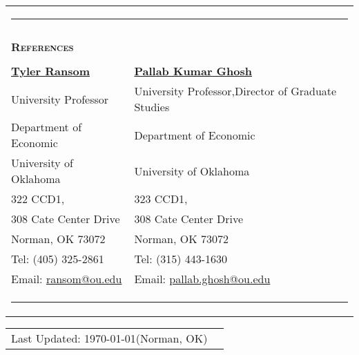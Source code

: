 \documentclass[10pt,letterpaper]{article}
\begin{document}
\begin{tabular}{p{4.25 in}p{3.75in}}
	\multicolumn{2}{p{7.5in}}{\hrule}\\
	\\
	{\large \textsc{\textbf{\large{References}}}} &\\
	\\
	\href{https://tyleransom.github.io/}{\textbf{Tyler Ransom}}                      & \href{https://sites.google.com/site/pallabghoshou/}{\textbf{Pallab Kumar Ghosh}} \\
	University Professor                                                                              & University Professor,Director of Graduate Studies \\
	Department of Economic                                                             & Department of Economic  \\
	University of Oklahoma                                                                    & University of Oklahoma \\
	322 CCD1,                                                                                   & 323 CCD1, \\
	308 Cate Center Drive                                                                              & 308 Cate Center Drive  \\
	Norman, OK 73072                                                                              & Norman, OK 73072   \\
	Tel: (405) 325-2861                                                                          & Tel: (315) 443-1630 \\
	Email: \href{ransom@ou.edu}{ransom@ou.edu}                        & Email: \href{pallab.ghosh@ou.edu}{pallab.ghosh@ou.edu}  \\
	
	
	
	\multicolumn{2}{p{7.5in}}{\hrule}
\end{tabular}

\vspace{1.5cm}
\begin{tabular}{p{3.5in}p{3.5in}}\\
	Last Updated: \today \hspace{0.1 cm}(Norman, OK) &\\
\end{tabular}
\end{document}
